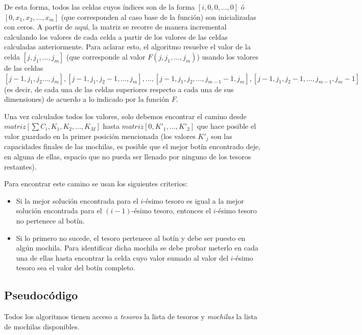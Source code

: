 De esta forma, todos las celdas cuyos índices son de la forma $[i, 0, 0,\dots,0]$ ó $[0, x_1, x_2, \dots, x_m]$ (que corresponden al caso base de la función) son inicializadas con ceros. A partir de aquí, la matriz se recorre de manera incremental calculando los valores de cada celda a partir de los valores de las celdas calculadas anteriormente. Para aclarar esto, el algoritmo resuelve el valor de la celda $[j,j_1,\dots,j_m]$ (que corresponde al valor $F(j,j_1,\dots,j_m)$) usando los valores de las celdas $[j-1,j_1,j_2\dots,j_m],[j-1,j_1,j_2-1,\dots,j_m],\dots,[j-1,j_1,j_2,\dots,j_{m-1}-1,j_m],[j-1,j_1,j_2-1,\dots,j_{m-1},j_m - 1]$ (es decir, de cada una de las celdas superiores respecto a cada una de sus dimensiones) de acuerdo a lo indicado por la función $F$.

Una vez calculados todos los valores, solo debemos encontrar el camino desde \\ $matriz\left[\sum C_i, K_1, K_2,\dots,K_M\right]$ hasta $matriz[0,K'_1,\dots,K'_2]$ que hace posible el valor guardado en la primer posición mencionada (los valores $K'_j$ son las capacidades finales de las mochilas, es posible que el mejor botín encontrado deje, en alguna de ellas, espacio que no pueda ser llenado por ninguno de los tesoros restantes).

Para encontrar este camino se usan los siguientes criterios:
\begin{itemize}
\item Si la mejor solución encontrada para el $i$-ésimo tesoro es igual a la mejor solución encontrada para el $(i-1)$-ésimo tesoro, entonces el $i$-ésimo tesoro no pertenece al botín.
\item Si lo primero no sucede, el tesoro pertenece al botín y debe ser puesto en algún mochila. Para identificar dicha mochila se debe probar meterlo en cada una de ellas hasta encontrar la celda cuyo valor sumado al valor del $i$-ésimo tesoro sea el valor del botín completo.
\end{itemize}

\newpage
\subsection{Pseudocódigo}

Todos los algoritmos tienen acceso a \textit{tesoros} la lista de tesoros y \textit{mochilas} la lista de mochilas disponibles.


